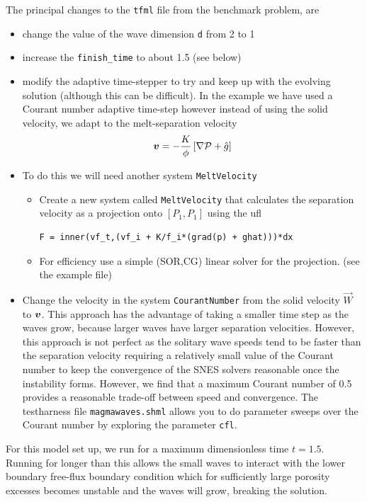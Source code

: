 The principal changes to the \texttt{tfml} file from the benchmark
problem, are
\begin{itemize}
\item change the value of the wave dimension \texttt{d} from 2 to 1
\item increase the \texttt{finish\_time} to about 1.5 (see below)
\item modify the adaptive time-stepper to try and keep up with the
evolving solution (although this can be difficult).  In the example we
have used a Courant number adaptive time-step however instead of
using the solid velocity, we adapt to the melt-separation velocity
\begin{equation}
  \label{eq:sep-velocity}
{\mbox{\boldmath$v$}}  = -\frac{K}{\phi}
\left[
  \nabla\mathcal{P} + \hat{g}
\right] 
\end{equation}
\item To do this we will need another system \texttt{MeltVelocity}
  \begin{itemize}
  \item Create a new system called \texttt{MeltVelocity} that
    calculates the separation velocity as a projection onto $[P_{1},P_{1}]$ using the ufl
\begin{lstlisting}[style=UFL]
F = inner(vf_t,(vf_i + K/f_i*(grad(p) + ghat)))*dx
\end{lstlisting}
\item For efficiency use a simple (SOR,CG) linear solver for the
  projection. (see the example file)
  \end{itemize}
\item Change the velocity in the system \texttt{CourantNumber} from
  the solid velocity $\vec{W}$ to ${\mbox{\boldmath$v$}}$. This approach has the advantage of
taking a smaller time step as the waves grow, because larger waves
have larger separation velocities.  However, this approach is not perfect as the solitary
wave speeds tend to be faster than the separation velocity requiring a
relatively small value of the Courant number to keep the convergence
of the SNES solvers reasonable once the instability forms.  However,
we find that a maximum Courant number of 0.5 provides a reasonable
trade-off between speed and convergence. The testharness file
\texttt{magmawaves.shml} allows you to do parameter sweeps over the Courant number by exploring the parameter \texttt{cfl}.  

\end{itemize}
 

For this model set up, we run for a maximum dimensionless time
$t=1.5$.  Running for longer than this allows the small waves to
interact with the lower boundary free-flux boundary condition which
for sufficiently large porosity excesses becomes unstable and the
waves will grow, breaking the solution.



